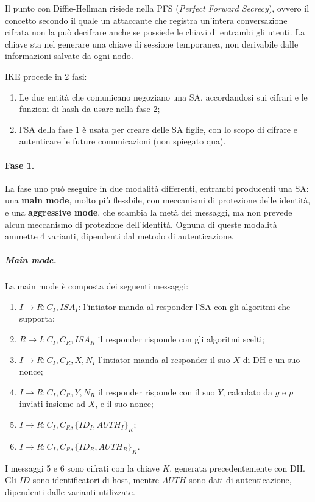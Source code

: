 \documentclass[a4paper, 10pt, twoside]{article}
\begin{document}
	Il punto con Diffie-Hellman risiede nella PFS (\textit{Perfect Forward Secrecy}), ovvero il concetto secondo il quale un attaccante che registra un'intera conversazione cifrata non la può decifrare anche se possiede le chiavi di entrambi gli utenti. La chiave sta nel generare una chiave di sessione temporanea, non derivabile dalle informazioni salvate da ogni nodo.

	IKE procede in 2 fasi:
	\begin{enumerate}
		\item Le due entità che comunicano negoziano una SA, accordandosi sui cifrari e le funzioni di hash da usare nella fase 2;
		\item l'SA della fase 1 è usata per creare delle SA figlie, con lo scopo di cifrare e autenticare le future comunicazioni (non spiegato qua).
	\end{enumerate}

	\paragraph{Fase 1.} La fase uno può eseguire in due modalità differenti, entrambi producenti una SA: una \textbf{main mode}, molto più flessbile, con meccanismi di protezione delle identità, e  una \textbf{aggressive mode}, che scambia la metà dei messaggi, ma non prevede alcun meccanismo di protezione dell'identità. Ognuna di queste modalità ammette 4 varianti, dipendenti dal metodo di autenticazione.

	\subparagraph{Main mode.}
	La main mode è composta dei seguenti messaggi: \begin{enumerate}
		\item $I \to R: C_I, ISA_I$: l'intiator manda al responder l'SA con gli algoritmi che supporta;
		\item $R \to I: C_I, C_R, ISA_R$ il responder risponde con gli algoritmi scelti;
		\item $I\to R: C_I, C_R, X, N_I$ l'intiator manda al responder il suo $X$ di DH e un suo nonce;
		\item $I\to R: C_I, C_R, Y, N_R$ il responder risponde con il suo $Y$, calcolato da $g$ e $p$ inviati insieme ad $X$, e il suo nonce;
		\item $I\to R: C_I, C_R, \lbrace ID_I, AUTH_I\rbrace_K$;
		\item $I\to R: C_I, C_R, \lbrace ID_R, AUTH_R\rbrace_K$.
	\end{enumerate}

	I messaggi 5 e 6 sono cifrati con la chiave $K$, generata precedentemente con DH. Gli $ID$ sono identificatori di host, mentre $AUTH$ sono dati di autenticazione, dipendenti dalle varianti utilizzate.
\end{document}
